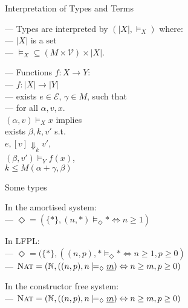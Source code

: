 \documentclass[xetex,serif,mathserif,aspectratio=169]{beamer}
\newcommand{\youtem}{\quad \textcolor{titlered!80}{---} \quad}
\newcommand{\HEAD}[1]{\textcolor{titlered}{#1}}
\begin{document}
\begin{frame}
  \HEAD{Interpretation of Types and Terms}

  \bigskip

  \youtem Types are interpreted by $(|X|, \models_X)$ where: \\
  \qquad \youtem $|X|$ is a set\\
  \qquad \youtem $\mathord{\models_X} \subseteq (M \times \mathcal{V})\times |X|$.

  \bigskip

  \youtem Functions $f : X \to Y$: \\
  \qquad \youtem $f : |X| \to |Y|$ \\
  \qquad \youtem exists $e \in \mathcal{E}$, $\gamma \in M$, such that \\
  \qquad \youtem for all $\alpha, v, x$. \\
  \qquad\qquad\qquad $(\alpha, v) \models_{X} x$ implies\\
  \qquad\qquad\qquad\qquad exists $\beta, k, v'$ s.t. \\
  \qquad\qquad\qquad\qquad\qquad $e, [v] \Downarrow_k v'$,\\
  \qquad\qquad\qquad\qquad\qquad $(\beta, v') \models_Y f(x)$,\\
  \qquad\qquad\qquad\qquad\qquad $k \leq M(\alpha+\gamma, \beta)$
\end{frame}

\begin{frame}
  \HEAD{Some types}

  \bigskip

  In the amortised system:\\
  \youtem $\Diamond = (\{*\}, (n, *) \models_\Diamond * \Leftrightarrow n \geq 1)$

  \bigskip

  In LFPL:\\
  \youtem $\Diamond = (\{*\}, ((n,p), * \models_\Diamond * \Leftrightarrow n \geq 1, p \geq 0)$ \\
  \youtem $\textsc{Nat} = (\mathbb{N}, ((n,p), n \models_\Diamond \underline{m}) \Leftrightarrow n \geq m, p \geq 0)$

  \bigskip

  In the constructor free system:\\
  \youtem $\textsc{Nat} = (\mathbb{N}, ((n,p), n \models_\Diamond \underline{m}) \Leftrightarrow n \geq m, p \geq 0)$

\end{frame}


\end{document}
